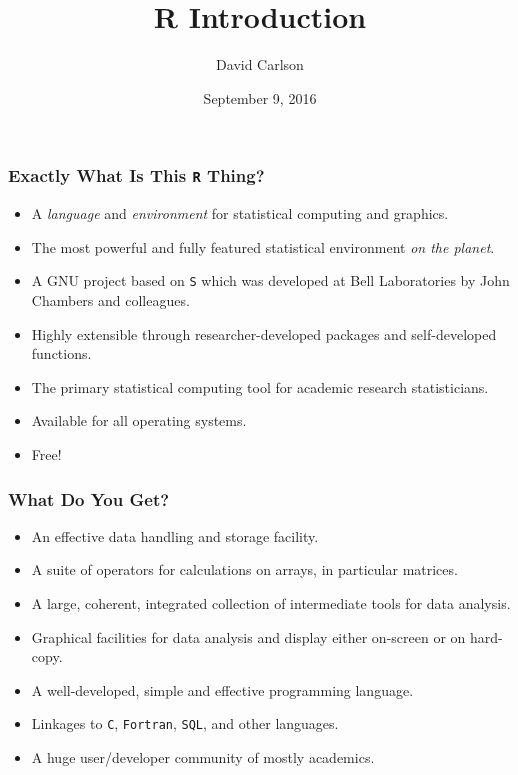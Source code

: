 \documentclass{beamer}
\title[Intro]{R Introduction}
\author{David Carlson}
\date{September 9, 2016}
\begin{document}
\begin{frame}
\titlepage
\end{frame}

\begin{frame}
\frametitle{$\qquad$\\[-8pt] Exactly What Is This \texttt{R} Thing?}
\begin{itemize}[<+->]
        \item   A \emph{language} and \emph{environment} for statistical computing and graphics.
	    \item	The most powerful and fully featured statistical environment \emph{on the planet}.
        \item   A GNU project based on \texttt{S} which was developed at Bell Laboratories by John Chambers and colleagues.
        \item   Highly extensible through researcher-developed packages and self-developed functions.
        \item   The primary statistical computing tool for academic research statisticians.
        \item   Available for all operating systems.
        \item   Free!
\end{itemize}
\end{frame}

\begin{frame}
\frametitle{What Do You Get?}
\begin{itemize}[<+->]
        \item   An effective data handling and storage facility.
        \item   A suite of operators for calculations on arrays, in particular matrices.
        \item   A large, coherent, integrated collection of intermediate tools for data analysis.
        \item   Graphical facilities for data analysis and display either on-screen or on hard-copy.
        \item   A well-developed, simple and effective programming language.
        \item   Linkages to \texttt{C}, \texttt{Fortran}, \texttt{SQL}, and other languages.
        \item   A huge user/developer community of mostly academics.
\end{itemize}
\end{frame}
\end{document}
